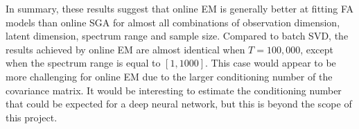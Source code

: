 \documentclass[msc,deptreport.inf]{infthesis} %
\begin{document}
In summary, these results suggest that online EM is generally better at fitting FA models than online SGA for almost all combinations of observation dimension, latent dimension, spectrum range and sample size. 
Compared to batch SVD, the results achieved by online EM are almost identical when $T=100,000$, except when the spectrum range is equal to $[1, 1000]$. This case would appear to be more challenging for online EM due to the larger conditioning number of the covariance matrix. It would be interesting to estimate the conditioning number that could be expected for a deep neural network, but this is beyond the scope of this project.  
\end{document}
